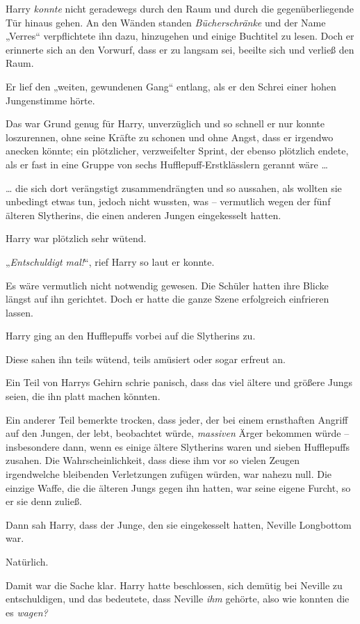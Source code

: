 Harry \emph{konnte} nicht geradewegs durch den Raum und durch die gegenüberliegende Tür hinaus gehen. An den Wänden standen \emph{Bücherschränke} und der Name „Verres“ verpflichtete ihn dazu, hinzugehen und einige Buchtitel zu lesen. Doch er erinnerte sich an den Vorwurf, dass er zu langsam sei, beeilte sich und verließ den Raum. 

Er lief den „weiten, gewundenen Gang“ entlang, als er den Schrei einer hohen Jungenstimme hörte. 

Das war Grund genug für Harry, unverzüglich und so schnell er nur konnte loszurennen, ohne seine Kräfte zu schonen und ohne Angst, dass er irgendwo anecken könnte; ein plötzlicher, verzweifelter Sprint, der ebenso plötzlich endete, als er fast in eine Gruppe von sechs Hufflepuff-Erstklässlern gerannt wäre … 

… die sich dort verängstigt zusammendrängten und so aussahen, als wollten sie unbedingt etwas tun, jedoch nicht wussten, was – vermutlich wegen der fünf älteren Slytherins, die einen anderen Jungen eingekesselt hatten. 

Harry war plötzlich sehr wütend. 

„\emph{Entschuldigt mal!}“, rief Harry so laut er konnte. 

Es wäre vermutlich nicht notwendig gewesen. Die Schüler hatten ihre Blicke längst auf ihn gerichtet. Doch er hatte die ganze Szene erfolgreich einfrieren lassen. 

Harry ging an den Hufflepuffs vorbei auf die Slytherins zu. 

Diese sahen ihn teils wütend, teils amüsiert oder sogar erfreut an. 

Ein Teil von Harrys Gehirn schrie panisch, dass das viel ältere und größere Jungs seien, die ihn platt machen könnten. 

Ein anderer Teil bemerkte trocken, dass jeder, der bei einem ernsthaften Angriff auf den Jungen, der lebt, beobachtet würde, \emph{massiven} Ärger bekommen würde – insbesondere dann, wenn es einige ältere Slytherins waren und sieben Hufflepuffs zusahen. Die Wahrscheinlichkeit, dass diese ihm vor so vielen Zeugen irgendwelche bleibenden Verletzungen zufügen würden, war nahezu null. Die einzige Waffe, die die älteren Jungs gegen ihn hatten, war seine eigene Furcht, so er sie denn zuließ. 

Dann sah Harry, dass der Junge, den sie eingekesselt hatten, Neville Longbottom war. 

Natürlich. 

Damit war die Sache klar. Harry hatte beschlossen, sich demütig bei Neville zu entschuldigen, und das bedeutete, dass Neville \emph{ihm} gehörte, also wie konnten die es \emph{wagen?} 


